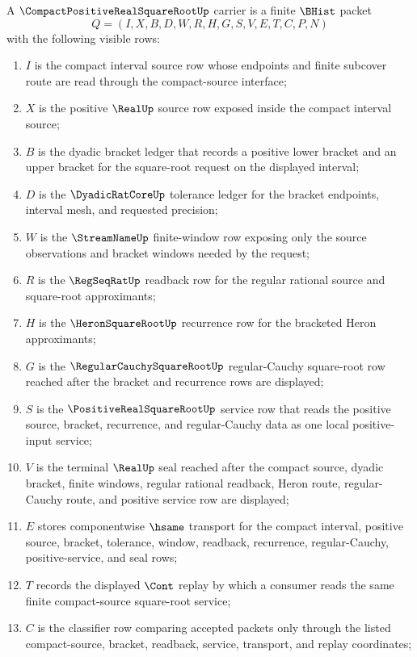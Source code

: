 \begin{definition}
\label{def:compact-positive-real-square-root-carrier}
A $\CompactPositiveRealSquareRootUp$ carrier is a finite $\BHist$ packet
$$
Q=(I,X,B,D,W,R,H,G,S,V,E,T,C,P,N)
$$
with the following visible rows:
\begin{enumerate}
\item $I$ is the compact interval source row whose endpoints and finite subcover route are read through the compact-source interface;
\item $X$ is the positive $\RealUp$ source row exposed inside the compact interval source;
\item $B$ is the dyadic bracket ledger that records a positive lower bracket and an upper bracket for the square-root request on the displayed interval;
\item $D$ is the $\DyadicRatCoreUp$ tolerance ledger for the bracket endpoints, interval mesh, and requested precision;
\item $W$ is the $\StreamNameUp$ finite-window row exposing only the source observations and bracket windows needed by the request;
\item $R$ is the $\RegSeqRatUp$ readback row for the regular rational source and square-root approximants;
\item $H$ is the $\HeronSquareRootUp$ recurrence row for the bracketed Heron approximants;
\item $G$ is the $\RegularCauchySquareRootUp$ regular-Cauchy square-root row reached after the bracket and recurrence rows are displayed;
\item $S$ is the $\PositiveRealSquareRootUp$ service row that reads the positive source, bracket, recurrence, and regular-Cauchy data as one local positive-input service;
\item $V$ is the terminal $\RealUp$ seal reached after the compact source, dyadic bracket, finite windows, regular rational readback, Heron route, regular-Cauchy route, and positive service row are displayed;
\item $E$ stores componentwise $\hsame$ transport for the compact interval, positive source, bracket, tolerance, window, readback, recurrence, regular-Cauchy, positive-service, and seal rows;
\item $T$ records the displayed $\Cont$ replay by which a consumer reads the same finite compact-source square-root service;
\item $C$ is the classifier row comparing accepted packets only through the listed compact-source, bracket, readback, service, transport, and replay coordinates;

\end{enumerate}
\end{definition}
